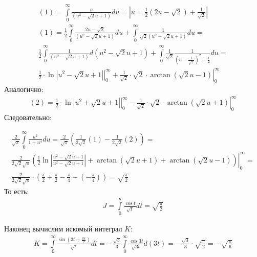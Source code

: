 \documentclass{article}
\begin{document}
\begin{equation*}
\begin{aligned}
(1) = \int\limits_0^{\infty} \frac{u}{(u^2-\sqrt{2}u+1)} du = |u = \frac{1}{2}(2u-\sqrt{2})+\frac{1}{\sqrt{2}}| \\
(1) = \frac{1}{2} \int\limits_0^{\infty} \frac{2u-\sqrt{2}}{(u^2-\sqrt{2}u+1)} du + \int\limits_0^{\infty} \frac{1}{\sqrt{2}(u^2-\sqrt{2}u+1)} du =\\
\frac{1}{2} \int\limits_0^{\infty} \frac{1}{(u^2-\sqrt{2}u+1)} d(u^2 -\sqrt{2}u+1) + \int\limits_0^{\infty} \frac{1}{\sqrt{2}}\frac{1}{(u-\frac{1}{\sqrt{2}})^2+\frac{1}{2}} du = \\
\left. \frac{1}{2}\cdot \ln{\left|u^2-\sqrt{2}u+1\right|} \right|_0^{\infty} + \left. \frac{1}{\sqrt{2}}\cdot \sqrt{2}\cdot \arctan(\sqrt{2}u-1) \right|_0^{\infty}
\end{aligned}
\end{equation*}
Аналогично:
\begin{equation*}
\begin{aligned}
(2) = \left. \frac{1}{2}\cdot \ln{\left|u^2+\sqrt{2}u+1\right|} \right|_0^{\infty} - \left. \frac{1}{\sqrt{2}}\cdot \sqrt{2}\cdot \arctan(\sqrt{2}u+1) \right|_0^{\infty}
\end{aligned}
\end{equation*}
Следовательно:

\begin{equation*}
\begin{aligned}
\frac{2}{\sqrt{\pi}} \int\limits_0^{\infty} \frac{u^2}{1+u^4} du = \frac{2}{\sqrt{\pi}} \left( \frac{1}{2\sqrt{2}} (1) - \frac{1}{2\sqrt{2}} (2) \right) = \\
\left. \frac{2}{2\sqrt{2}\sqrt{\pi}} \left( \frac{1}{2}  \ln{\left|\frac{u^2-\sqrt{2}u+1}{u^2-\sqrt{2}u+1}\right|} +   \arctan(\sqrt{2}u+1) +  \arctan(\sqrt{2}u-1)  \right) \right|_0^{\infty} = \\
\frac{2}{2\sqrt{2} \sqrt{\pi}}\cdot \left(\frac{\pi}{2} + \frac{\pi}{2} - \frac{\pi}{4} - \left(-\frac{\pi}{4}\right) \right) = \sqrt{\frac{\pi}{2}}
\end{aligned}
\end{equation*}
То есть:
\begin{equation*}
\begin{aligned}
J = \int\limits_0^{\infty} \frac{\cos{t}}{\sqrt{t}} dt = \sqrt{\frac{\pi}{2}}
\end{aligned}
\end{equation*}

Наконец вычислим искомый интеграл $K$:
\begin{equation*}
\begin{aligned}
K = \int\limits_0^{\infty} \frac{\sin(3t + \frac{3\pi}{2})}{\sqrt{t}} dt = -\frac{\sqrt{3}}{3}\int\limits_0^{\infty} \frac{\cos{3t}}{\sqrt{3t}} d (3t) = -\frac{\sqrt{3}}{3}\cdot \sqrt{\frac{\pi}{2}} = -\sqrt{\frac{\pi}{6}}
\end{aligned}
\end{equation*}
\end{document}
